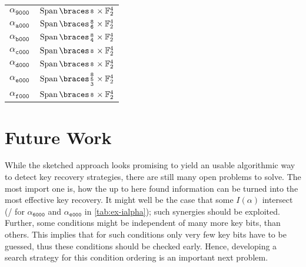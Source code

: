 {\begin{tabular}{cc}
        $\alpha_{\mathtt{9000}}$ & $\Span{\begin{smallmatrix}\mathtt{8}\end{smallmatrix}} \times \F_2^4$ \\
        $\alpha_{\mathtt{a000}}$ & $\Span{\begin{smallmatrix}\mathtt{8} \\ \mathtt{6}\end{smallmatrix}} \times \F_2^4$ \\
        $\alpha_{\mathtt{b000}}$ & $\Span{\begin{smallmatrix}\mathtt{8} \\ \mathtt{4}\end{smallmatrix}} \times \F_2^4$ \\
        $\alpha_{\mathtt{c000}}$ & $\Span{\begin{smallmatrix}\mathtt{8}\end{smallmatrix}} \times \F_2^4$ \\
        $\alpha_{\mathtt{d000}}$ & $\Span{\begin{smallmatrix}\mathtt{8}\end{smallmatrix}} \times \F_2^4$ \\
        $\alpha_{\mathtt{e000}}$ & $\Span{\begin{smallmatrix}\mathtt{8} \\ \mathtt{5} \\ \mathtt{3}\end{smallmatrix}} \times \F_2^4$ \\
        $\alpha_{\mathtt{f000}}$ & $\Span{\begin{smallmatrix}\mathtt{8}\end{smallmatrix}} \times \F_2^4$ \\
        \bottomrule
    \end{tabular}
}

\section{Future Work}

While the sketched approach looks promising to yield an usable algorithmic way to detect key recovery strategies, there are still many open problems to solve.
The most import one is, how the up to here found information can be turned into the most effective key recovery.
It might well be the case that some $I(\alpha)$ intersect (\eg/ for $\alpha_{\mathtt{6000}}$ and $\alpha_{\mathtt{e000}}$ in \cref{tab:ex-ialpha}); such synergies should be exploited.
Further, some conditions might be independent of many more key bits, than others.
This implies that for such conditions only very few key bits have to be guessed, thus these conditions should be checked early.
Hence, developing a search strategy for this condition ordering is an important next problem.

